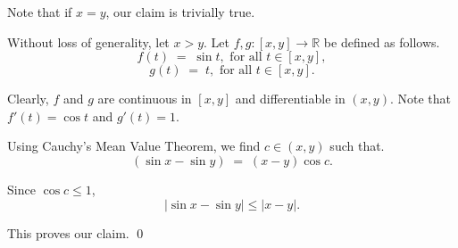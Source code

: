 \documentclass[10pt]{article}
\begin{document}
\begin{enumerate}
		Note that if $x = y$, our claim is trivially true.
		
		Without loss of generality, let $x > y$.
		Let $f, g\colon [x, y] \to \mathbb{R}$ be defined as follows.
		\[ f(t) \;=\; \sin{t}, \text{ for all } t \in [x, y],\]
		\[ g(t) \;=\; t, \text{ for all } t \in [x, y].\]
		
		Clearly, $f$ and $g$ are continuous in $[x, y]$ and differentiable in $(x, y)$.
		Note that $f'(t) = \cos{t}$ and $g'(t) = 1$.
		
		Using Cauchy's Mean Value Theorem, we find $c \in (x, y)$ such that.
		\[(\sin{x} - \sin{y}) \;=\; (x - y)\cos{c}.\]
		
		Since $\cos{c} \le 1$,
		\[|\sin{x} - \sin{y}| \le |x - y|.\]
		
		This proves our claim. \qed
	\end{enumerate}
\end{document}
